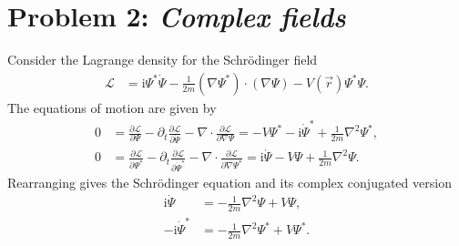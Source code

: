 \documentclass[english, parskip=full]{scrartcl}
\renewcommand{\i}{\text{i}}
\begin{document}
\newpage
\section*{Problem 2: \normalfont\textit{\large{Complex fields}}}
Consider the Lagrange density for the Schrödinger field
\begin{align}
\mathcal{L} &= \i\Psi^\ast\dot{\Psi} - \frac{1}{2m} (\nabla\Psi^\ast) \cdot (\nabla\Psi) - V(\vec{r}) \Psi^\ast\Psi.
\end{align}
The equations of motion are given by
\begin{align}
0 &= \frac{\partial\mathcal{L}}{\partial\Psi} - \partial_t \frac{\partial\mathcal{L}}{\partial \dot{\Psi}} - \nabla \cdot \frac{\partial\mathcal{L}}{\partial \nabla\Psi} = -V\Psi^\ast - \i\dot{\Psi}^\ast + \frac{1}{2m}\nabla^2\Psi^\ast,\\
0 &= \frac{\partial\mathcal{L}}{\partial\Psi^\ast} - \partial_t \frac{\partial\mathcal{L}}{\partial \dot{\Psi}^\ast} - \nabla \cdot \frac{\partial\mathcal{L}}{\partial \nabla\Psi^\ast} = \i\dot{\Psi} - V\Psi + \frac{1}{2m}\nabla^2\Psi.
\end{align}
Rearranging gives the Schrödinger equation and its complex conjugated version
\begin{align}
\i\dot{\Psi} &= -\frac{1}{2m}\nabla^2\Psi + V\Psi,\\
-\i\dot{\Psi}^\ast &= -\frac{1}{2m}\nabla^2\Psi^\ast + V\Psi^\ast.
\end{align}
\end{document}

